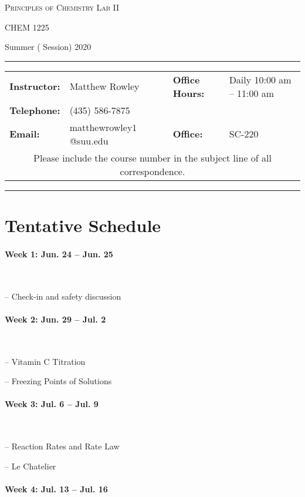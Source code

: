\documentclass[12pt, letterpaper]{article}
\begin{document}
\begin{center}
{\Large \textsc{Principles of Chemistry Lab II}}

CHEM 1225
\end{center}
\begin{center}
{\large Summer ( Session) 2020}
\end{center}
\begin{center}
	\rule{0.98\textwidth}{0.4pt}
	\begin{tabular}{llcll}
		\textbf{Instructor:} & Matthew Rowley & & \textbf{Office Hours:} & Daily 10:00 am -- 11:00 am \\
		\textbf{Telephone:} & (435) 586-7875 & & & \\
		\textbf{Email:} & matthewrowley$1$@suu.edu  & & \textbf{Office:} & SC-220\\
		\multicolumn{5}{c}{Please include the course number in the subject line of all correspondence.} 
	\end{tabular}
	\rule{0.98\textwidth}{0.4pt}
\end{center}

\section*{Tentative Schedule}

\paragraph*{Week 1: Jun. 24 -- Jun. 25}~

-- Check-in and safety discussion

\paragraph{Week 2: Jun. 29 -- Jul. 2}~

-- Vitamin C Titration

-- Freezing Points of Solutions

\paragraph{Week 3: Jul. 6 -- Jul. 9}~

-- Reaction Rates and Rate Law

-- Le Chatelier

\paragraph{Week 4: Jul. 13 -- Jul. 16}~
\end{document}
